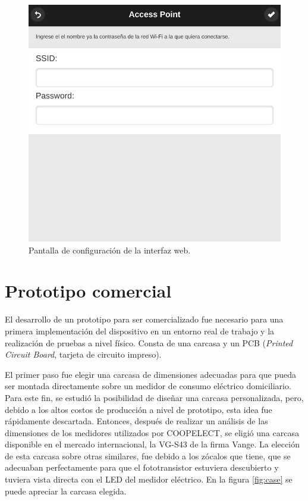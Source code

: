 \begin{figure}[h]
	\centering
	\includegraphics[scale=0.35]{./Figures/interface_conf.png}
	\caption{Pantalla de configuración de la interfaz web.}
	\label{fig:interfaceConf}
\end{figure}

\section{Prototipo comercial}

El desarrollo de un prototipo para ser comercializado fue necesario para una primera implementación del dispositivo en un entorno real de trabajo y la realización de pruebas a nivel físico. Consta de una carcasa y un PCB (\textit{Printed Circuit Board}, tarjeta de circuito impreso).

El primer paso fue elegir una carcasa de dimensiones adecuadas para que pueda ser montada directamente sobre un medidor de consumo eléctrico domiciliario. Para este fin, se estudió la posibilidad de diseñar una carcasa personalizada, pero, debido a los altos costos de producción a nivel de prototipo, esta idea fue rápidamente descartada. Entonces, después de realizar un análisis de las dimensiones de los medidores utilizados por COOPELECT, se eligió una carcasa disponible en el mercado internacional, la VG-S43 de la firma Vange. La elección de esta carcasa sobre otras similares, fue debido a los zócalos que tiene, que se adecuaban perfectamente para que el fototransistor estuviera descubierto y tuviera vista directa con el LED del medidor eléctrico. En la figura \ref{fig:case} se puede apreciar la carcasa elegida.

